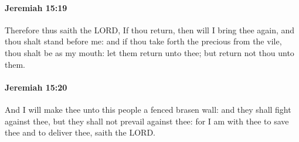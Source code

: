 		\paragraph{Jeremiah 15:19} %
			\label{JEREMIAH-15-19}

			Therefore thus saith the LORD, If thou return, then will I bring thee again, and thou shalt stand before me: and if thou take forth the precious from the vile, thou shalt be as my mouth: let them return unto thee; but return not thou unto them.


		\paragraph{Jeremiah 15:20} %
			\label{JEREMIAH-15-20}

			And I will make thee unto this people a fenced brasen wall: and they shall fight against thee, but they shall not prevail against thee: for I am with thee to save thee and to deliver thee, saith the LORD.

